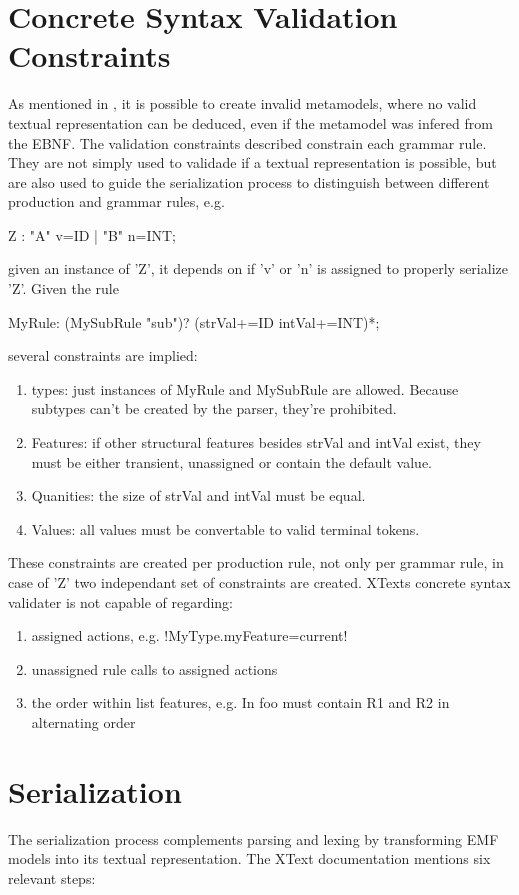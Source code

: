 \section{Concrete Syntax Validation Constraints}
As mentioned in \cite{MofCfg}, it is possible to create invalid metamodels, where no valid textual representation can be deduced, even if the metamodel was infered from the EBNF. The validation constraints described constrain each grammar rule. They are not simply used to validade if a textual representation is possible, but are also used to guide the serialization process to distinguish between different production and grammar rules, e.g.
\begin{xtxt}
Z 	:  "A" v=ID  
	|  "B" n=INT;
\end{xtxt}
given an instance of 'Z', it depends on if 'v' or 'n' is assigned to properly serialize 'Z'.
Given the rule
\begin{xtxt}
MyRule:	({MySubRule} "sub")? (strVal+=ID intVal+=INT)*;
\end{xtxt}
several constraints are implied:
\begin{enumerate}
	\item types: just instances of MyRule and MySubRule are allowed. Because subtypes can't be created by the parser, they're prohibited. 
	\item Features: if other structural features besides strVal and intVal exist, they must be either transient, unassigned or contain the default value.
	\item Quanities: the size of strVal and intVal must be equal.
	\item Values: all values must be convertable to valid terminal tokens.
\end{enumerate}
These constraints are created per production rule, not only per grammar rule, in case of 'Z' two independant set of constraints are created.
XTexts concrete syntax validater is not capable of regarding:
\begin{enumerate}
	\item assigned actions, e.g. 
	\kode!{MyType.myFeature=current}!
	\item unassigned rule calls to assigned actions
	\item the order within list features, e.g. In  foo must contain R1 and R2 in alternating order
\end{enumerate}

\section{Serialization}
The serialization process complements parsing and lexing by transforming EMF models into its textual representation. The XText documentation mentions six relevant steps:

